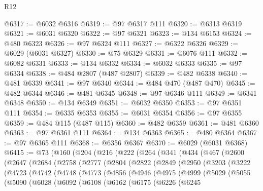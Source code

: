 \begin{lexlean}{R12}
\begin{coremodule}
@6317 := @6032 @6316
@6319 := @97 @6317 @111
@6320 := @6313 @6319
@6321 := @6031 @6320
@6322 := @97 @6321
@6323 := @134 @6153
@6324 := @480 @6323
@6326 := @97 @6324 @111
@6327 := @6322 @6326
@6329 := @6029 (@6031 @6327)
@6330 := @75 @6329
@6331 := @6076 @111
@6332 := @6082 @6331
@6333 := @134 @6332
@6334 := @6032 @6333
@6335 := @97 @6334
@6338 := @484 @2807 (@487 @2807)
@6339 := @482 @6338
@6340 := @481 @6339
@6341 := @97 @6340
@6344 := @484 @470 (@487 @470)
@6345 := @482 @6344
@6346 := @481 @6345
@6348 := @97 @6346 @111
@6349 := @6341 @6348
@6350 := @134 @6349
@6351 := @6032 @6350
@6353 := @97 @6351 @111
@6354 := @6335 @6353
@6355 := @6031 @6354
@6356 := @97 @6355
@6359 := @484 @115 (@487 @115)
@6360 := @482 @6359
@6361 := @481 @6360
@6363 := @97 @6361 @111
@6364 := @134 @6363
@6365 := @480 @6364
@6367 := @97 @6365 @111
@6368 := @6356 @6367
@6370 := @6029 (@6031 @6368)
@6415 := @73
    (@160
      (@204
        (@216
          (@222
            (@264
              (@341
                (@434
                  (@467
                    (@2600
                      (@2647
                        (@2684
                          (@2758
                            (@2777
                              (@2804
                                (@2822
                                  (@2849
                                    (@2950
                                      (@3203
                                        (@3222
                                          (@4723
                                            (@4742
                                              (@4748
                                                (@4773
                                                  (@4856
                                                    (@4946
                                                      (@4975
                                                        (@4999
                                                          (@5029
                                                            (@5055
                                                              (@5090
                                                                (@6028
                                                                  (@6092
                                                                    (@6108
                                                                      (@6162
                                                                        (@6175
                                                                          (@6226
                                                                            (@6245

\end{coremodule}
\end{lexlean}
